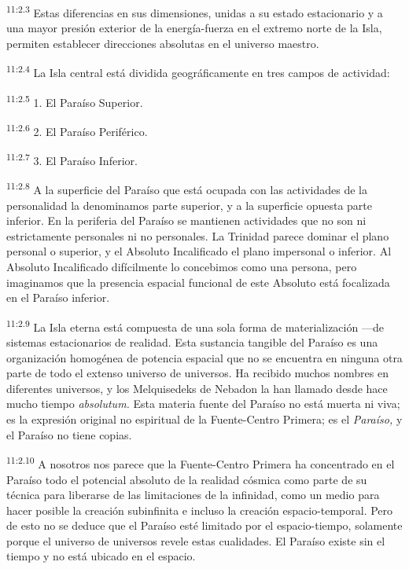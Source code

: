 \par
\textsuperscript{11:2.3} Estas diferencias en sus dimensiones, unidas a su estado estacionario y a una mayor presión exterior de la energía-fuerza en el extremo norte de la Isla, permiten establecer direcciones absolutas en el universo maestro.

\par
\textsuperscript{11:2.4} La Isla central está dividida geográficamente en tres campos de actividad:

\par
\textsuperscript{11:2.5} 1. El Paraíso Superior.

\par
\textsuperscript{11:2.6} 2. El Paraíso Periférico.

\par
\textsuperscript{11:2.7} 3. El Paraíso Inferior.

\par
\textsuperscript{11:2.8} A la superficie del Paraíso que está ocupada con las actividades de la personalidad la denominamos parte superior, y a la superficie opuesta parte inferior. En la periferia del Paraíso se mantienen actividades que no son ni estrictamente personales ni no personales. La Trinidad parece dominar el plano personal o superior, y el Absoluto Incalificado el plano impersonal o inferior. Al Absoluto Incalificado difícilmente lo concebimos como una persona, pero imaginamos que la presencia espacial funcional de este Absoluto está focalizada en el Paraíso inferior.

\par
\textsuperscript{11:2.9} La Isla eterna está compuesta de una sola forma de materialización ---de sistemas estacionarios de realidad. Esta sustancia tangible del Paraíso es una organización homogénea de potencia espacial que no se encuentra en ninguna otra parte de todo el extenso universo de universos. Ha recibido muchos nombres en diferentes universos, y los Melquisedeks de Nebadon la han llamado desde hace mucho tiempo \textit{absolutum.} Esta materia fuente del Paraíso no está muerta ni viva; es la expresión original no espiritual de la Fuente-Centro Primera; es el \textit{Paraíso,} y el Paraíso no tiene copias.

\par
\textsuperscript{11:2.10} A nosotros nos parece que la Fuente-Centro Primera ha concentrado en el Paraíso todo el potencial absoluto de la realidad cósmica como parte de su técnica para liberarse de las limitaciones de la infinidad, como un medio para hacer posible la creación subinfinita e incluso la creación espacio-temporal. Pero de esto no se deduce que el Paraíso esté limitado por el espacio-tiempo, solamente porque el universo de universos revele estas cualidades. El Paraíso existe sin el tiempo y no está ubicado en el espacio.

